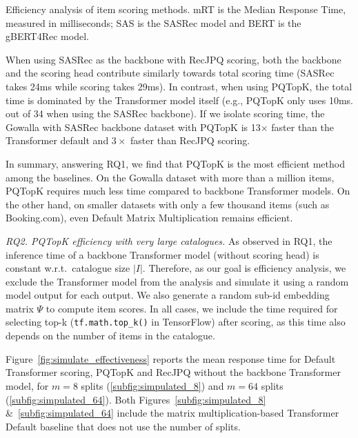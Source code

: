 \documentclass[sigconf,natbib=true, review=False]{acmart} %
\newcommand{\rsasha}[1]{\textcolor[HTML]{000000}{#1}}
\newcommand{\gsasha}[1]{\textcolor[HTML]{000000}{#1}}
\newcommand{\scr}[1]{\textcolor[HTML]{000000}{#1}}
\begin{document}
\begin{table}
\caption{Efficiency analysis of item scoring methods. mRT is the Median Response Time, measured in milliseconds; SAS is the SASRec model and BERT is the gBERT4Rec model.} \label{tb:main}
\vspace{-1\baselineskip}

\end{table}

 When using  \gsasha{SASRec as the backbone with RecJPQ scoring}, both \gsasha{the backbone and the scoring head} contribute \gsasha{similarly} towards total scoring time (SASRec takes 24ms while scoring takes 29ms). \rsasha{In contrast}, when using PQTopK, the total time \rsasha{is dominated by} the Transformer model itself (e.g., PQTopK only uses 10\gsasha{ms.}  out of 34 when using the SASRec backbone). If we isolate scoring time, the Gowalla with SASRec backbone dataset with  PQTopK is 13$\times$ faster than the Transformer default and $3\times$ faster than RecJPQ scoring.

In summary, answering RQ1, we find that PQTopK is the most efficient method among the baselines. \rsasha{On the Gowalla dataset with more than a million items, PQTopK} requires much less time compared to backbone Transformer models. On the other hand, on smaller datasets with only a few thousand items (such as Booking.com), even Default Matrix Multiplication remains efficient. 


\textit{RQ2. PQTopK efficiency with very large catalogues.} As observed in RQ1, the inference time of a backbone Transformer model (without scoring head) is constant \rsasha{w.r.t.\ catalogue size $|I|$}. Therefore, as our goal is efficiency analysis, we exclude the Transformer model from the analysis and simulate it using a random model output for each output. \scr{We also generate} a random sub-id embedding matrix $\Psi$ to compute item scores. In all cases, we include the time required for selecting top-k (\rsasha{\texttt{tf.math.top\_k()} in TensorFlow}) after scoring, as this time also depends on the number of items in the catalogue. 


Figure~\ref{fig:simulate_effectiveness} reports the mean response time for Default Transformer scoring, PQTopK and RecJPQ without the backbone Transformer model, for  $m=8$ splits (\ref{subfig:simpulated_8}) and $m=64$ splits (\ref{subfig:simpulated_64}).
Both \scr{Figures}~\ref{subfig:simpulated_8} \&~\ref{subfig:simpulated_64} include the matrix multiplication-based Transformer Default baseline that does not \gsasha{use} the number of splits. 
\end{document}
